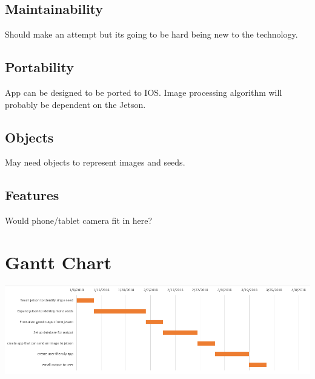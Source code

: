 \documentclass[onecolumn, draftclsnofoot,10pt, compsoc]{IEEEtran}
\begin{document}
\subsection{Maintainability}
Should make an attempt but its going to be hard being new to the technology.

\subsection{Portability}
App can be designed to be ported to IOS.
Image processing algorithm will probably be dependent on the Jetson.

\subsection{Objects}
May need objects to represent images and seeds.

\subsection{Features}
Would phone/tablet camera fit in here?

\section{Gantt Chart}
\includegraphics[natwidth=990,natheight=286]{gantt_chart.PNG}
\end{document}
